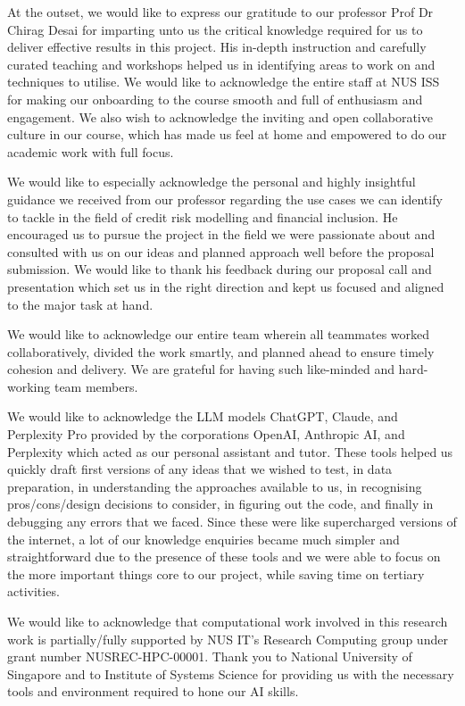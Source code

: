 \begin{acknowledgements}
At the outset, we would like to express our gratitude to our professor Prof Dr Chirag Desai for imparting unto us the critical knowledge required for us to deliver effective results in this project. His in-depth instruction and carefully curated teaching and workshops helped us in identifying areas to work on and techniques to utilise. We would like to acknowledge the entire staff at NUS ISS for making our onboarding to the course smooth and full of enthusiasm and engagement. We also wish to acknowledge the inviting and open collaborative culture in our course, which has made us feel at home and empowered to do our academic work with full focus.

We would like to especially acknowledge the personal and highly insightful guidance we received from our professor regarding the use cases we can identify to tackle in the field of credit risk modelling and financial inclusion. He encouraged us to pursue the project in the field we were passionate about and consulted with us on our ideas and planned approach well before the proposal submission. We would like to thank his feedback during our proposal call and presentation which set us in the right direction and kept us focused and aligned to the major task at hand.

We would like to acknowledge our entire team wherein all teammates worked collaboratively, divided the work smartly, and planned ahead to ensure timely cohesion and delivery. We are grateful for having such like-minded and hard-working team members.

We would like to acknowledge the LLM models ChatGPT, Claude, and Perplexity Pro provided by the corporations OpenAI, Anthropic AI, and Perplexity which acted as our personal assistant and tutor. These tools helped us quickly draft first versions of any ideas that we wished to test, in data preparation, in understanding the approaches available to us, in recognising pros/cons/design decisions to consider, in figuring out the code, and finally in debugging any errors that we faced. Since these were like supercharged versions of the internet, a lot of our knowledge enquiries became much simpler and straightforward due to the presence of these tools and we were able to focus on the more important things core to our project, while saving time on tertiary activities.

We would like to acknowledge that computational work involved in this research work is partially/fully supported by NUS IT's Research Computing group under grant number NUSREC-HPC-00001. Thank you to National University of Singapore and to Institute of Systems Science for providing us with the necessary tools and environment required to hone our AI skills.
\end{acknowledgements}

